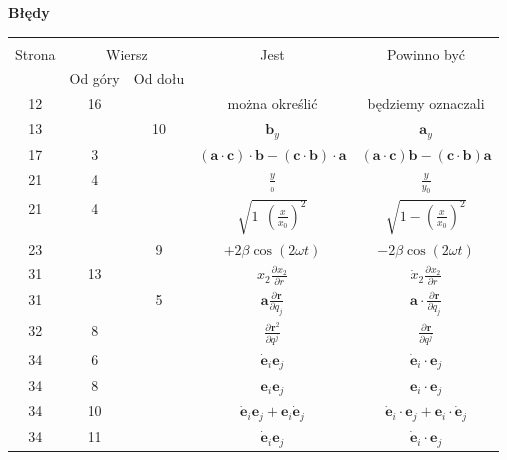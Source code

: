 \documentclass[a4paper,11pt]{article}
\newcommand{\tb}{\textbf}
\newcommand{\tb}{\textbf}
\newcommand{\Center}[1]{\begin{center} #1 \end{center}}
\newcommand{\CenterTB}[1]{\Center{\tb{#1}}}
\newcommand{\fr}{\frac}
\newcommand{\pr}{\partial}
\newcommand{\pd}[3]{\fr{ \pr^{ #1 } { #2 } }{ \pr { #3 }^{ #1 } }}
\newcommand{\fr}{\frac}
\newcommand{\pr}{\partial}
\newcommand{\pd}[3]{\fr{ \pr^{ #1 } { #2 } }{ \pr { #3 }^{ #1 } }}
\newcommand{\tb}{\textbf}
\newcommand{\Center}[1]{\begin{center} #1 \end{center}}
\newcommand{\CenterTB}[1]{\Center{\tb{#1}}}
\begin{document}
\CenterTB{Błędy}
\begin{center}
  \begin{tabular}{|c|c|c|c|c|}
    \hline
    & \multicolumn{2}{c|}{} & & \\
    Strona & \multicolumn{2}{c|}{Wiersz}& Jest & Powinno być \\ \cline{2-3}
    & Od góry & Od dołu &  &  \\ \hline
    12 & 16 & & można określić & będziemy oznaczali \\
    13 & & 10 & $\mathbf{ b }_{ y }$ & $\mathbf{ a }_{ y }$ \\
    17 & 3 & & $(\mathbf{ a } \cdot \mathbf{ c } ) \cdot \mathbf{ b }
               - ( \mathbf{ c } \cdot \mathbf{ b } ) \cdot \mathbf{ a }$
           & $(\mathbf{ a } \cdot \mathbf{ c } ) \mathbf{ b }
             - ( \mathbf{ c } \cdot \mathbf{ b } ) \mathbf{ a }$ \\
    21 & 4 & & $\frac{ y }{ { }_{ 0 } }$ & $\frac{ y }{ { y }_{ 0 } }$ \\
    21 & 4 & & $\sqrt{ 1 \:\: \left( \frac{ x }{ x_{ 0 } }
               \right)^{ 2 } } $
           & $\sqrt{ 1 - \left( \frac{ x }{ x_{ 0 } } \right)^{ 2 } } $ \\
    23 & & 9 & $+2\beta \cos( 2\omega t )$ & $-2\beta
                                             \cos( 2\omega t )$ \\
    31 & 13 & & $x_{ 2 } \pd{}{ x_{ 2 } }{ r }$
           & $\dot{ x }_{ 2 } \pd{}{ x_{ 2 } }{ r }$ \\
    31 & & 5 & $\mathbf{ a } \pd{}{ \mathbf{ r } }{ q_{ j } }$
           & $\mathbf{ a } \cdot \pd{}{ \mathbf{ r } }{ q_{ j } }$ \\
    32 & 8 & & $\pd{}{ { \mathbf{ r }^{ 2 } } }{ { q^{ j } } }$
           & $\pd{}{ \mathbf{ r } }{ { q^{ j } } }$ \\
    34 & 6 & & $\dot{ \mathbf{ e } }_{ i } \mathbf{ e }_{ j }$
           & $\dot{ \mathbf{ e } }_{ i } \cdot \mathbf{ e }_{ j }$ \\
    34 & 8 & & $\mathbf{ e }_{ i } \mathbf{ e }_{ j }$
           & $\mathbf{ e }_{ i } \cdot \mathbf{ e }_{ j }$ \\
    34 & 10 & & $\dot{ \mathbf{ e } }_{ i } \mathbf{ e }_{ j }
                + \mathbf{ e }_{ i } \dot{ \mathbf{ e } }_{ j }$
           & $\dot{ \mathbf{ e } }_{ i } \cdot \mathbf{ e }_{ j }
             + \mathbf{ e }_{ i } \cdot \dot{ \mathbf{ e } }_{ j }$ \\
    34 & 11 & & $\dot{ \mathbf{ e } }_{ i } \mathbf{ e }_{ j }$
           & $\dot{ \mathbf{ e } }_{ i } \cdot \mathbf{ e }_{ j }$ \\

\end{tabular}
\end{center}
\end{document}
